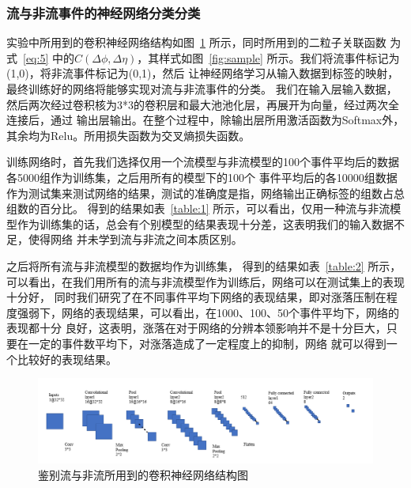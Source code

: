 \documentclass[aps,pre,12pt,preprint,onecolumn,showpacs,showkeys]{revtex4-1}
\begin{document}
\subsubsection{流与非流事件的神经网络分类分类}
实验中所用到的卷积神经网络结构如图~\ref{fig:sjwl} 所示，同时所用到的二粒子关联函数
为式~\ref{eq:5} 中的$C(\Delta\phi,\Delta\eta)$，其样式如图~\ref{fig:sample} 所示。我们将流事件标记为(1,0)，将非流事件标记为(0,1)，然后
让神经网络学习从输入数据到标签的映射，最终训练好的网络将能够实现对流与非流事件的分类。
我们在输入层输入数据，然后两次经过卷积核为3*3的卷积层和最大池池化层，再展开为向量，经过两次全连接后，通过
输出层输出。在整个过程中，除输出层所用激活函数为Softmax外，其余均为Relu。所用损失函数为交叉熵损失函数。\par
训练网络时，首先我们选择仅用一个流模型与非流模型的100个事件平均后的数据各5000组作为训练集，之后用所有的模型下的100个
事件平均后的各10000组数据作为测试集来测试网络的结果，测试的准确度是指，网络输出正确标签的组数占总组数的百分比。
得到的结果如表~\ref{table:1} 所示，可以看出，仅用一种流与非流模型作为训练集的话，总会有个别模型的结果表现十分差，这表明我们的输入数据不足，使得网络
并未学到流与非流之间本质区别。\par
之后将所有流与非流模型的数据均作为训练集，
得到的结果如表~\ref{table:2} 所示，可以看出，在我们用所有的流与非流模型作为训练后，网络可以在测试集上的表现十分好，
同时我们研究了在不同事件平均下网络的表现结果，即对涨落压制在程度强弱下，网络的表现结果，可以看出，在1000、100、50个事件平均下，网络的表现都十分
良好，这表明，涨落在对于网络的分辨本领影响并不是十分巨大，只要在一定的事件数平均下，对涨落造成了一定程度上的抑制，网络
就可以得到一个比较好的表现结果。
\begin{figure}[htbp]
\centering
\includegraphics[width=140mm]{sjwl}
\caption{\label{fig:sjwl}%
鉴别流与非流所用到的卷积神经网络结构图}
\end{figure}
\end{document}

